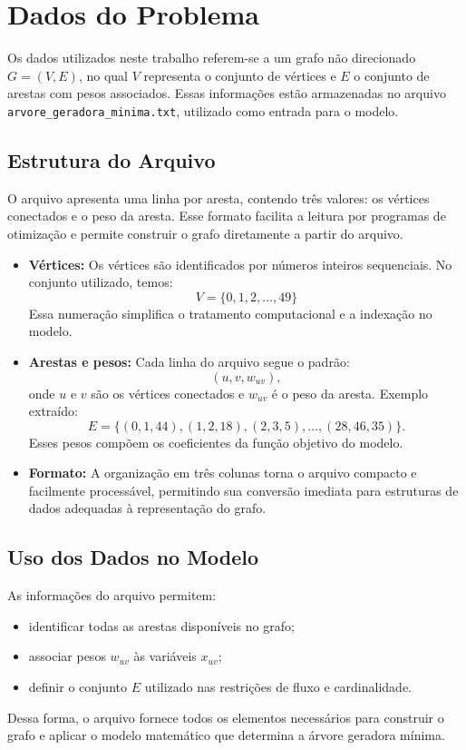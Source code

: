 \section{Dados do Problema}%
\label{sec:dados_problema}

Os dados utilizados neste trabalho referem-se a um grafo não direcionado $G = (V, E)$, no qual $V$ representa o conjunto de vértices e $E$ o conjunto de arestas com pesos associados. Essas informações estão armazenadas no arquivo \texttt{arvore\_geradora\_minima.txt}, utilizado como entrada para o modelo.

\subsection*{Estrutura do Arquivo}%
\label{sec:estrutura_arquivo}

O arquivo apresenta uma linha por aresta, contendo três valores: os vértices conectados e o peso da aresta. Esse formato facilita a leitura por programas de otimização e permite construir o grafo diretamente a partir do arquivo.

\begin{itemize}
    \item \textbf{Vértices:}  
    Os vértices são identificados por números inteiros sequenciais. No conjunto utilizado, temos:
    \[
        V = \{0,1,2,\ldots,49\}
    \]
    Essa numeração simplifica o tratamento computacional e a indexação no modelo.

    \item \textbf{Arestas e pesos:}  
    Cada linha do arquivo segue o padrão:
    \[
        (u,v,w_{uv}),
    \]
    onde $u$ e $v$ são os vértices conectados e $w_{uv}$ é o peso da aresta. Exemplo extraído:
    \[
        E = \{(0,1,44), (1,2,18), (2,3,5), \ldots, (28,46,35)\}.
    \]
    Esses pesos compõem os coeficientes da função objetivo do modelo.

    \item \textbf{Formato:}  
    A organização em três colunas torna o arquivo compacto e facilmente processável, permitindo sua conversão imediata para estruturas de dados adequadas à representação do grafo.

\end{itemize}

\subsection*{Uso dos Dados no Modelo}%
\label{sec:dados_modelo}

As informações do arquivo permitem:

\begin{itemize}
    \item identificar todas as arestas disponíveis no grafo;
    \item associar pesos $w_{uv}$ às variáveis $x_{uv}$;
    \item definir o conjunto $E$ utilizado nas restrições de fluxo e cardinalidade.
\end{itemize}

Dessa forma, o arquivo fornece todos os elementos necessários para construir o grafo e aplicar o modelo matemático que determina a árvore geradora mínima.
